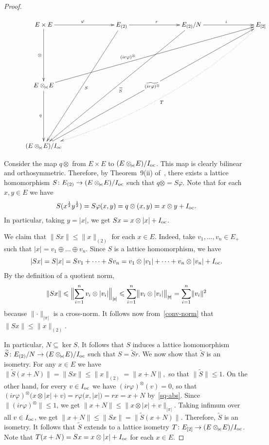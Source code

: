 \documentclass[12pt]{amsart}
\theoremstyle{plain}
\theoremstyle{definition}
\newcommand{\abs}[1]{\lvert#1\rvert}
\newcommand{\norm}[1]{\lVert#1\rVert}
\newcommand{\bignorm}[1]{\bigl\lVert#1\bigr\rVert}
\newcommand{\Bignorm}[1]{\Bigl\lVert#1\Bigr\rVert}
\renewcommand{\le}{\leqslant}
\def\api{{\abs{\!\pi\!}}}
\def\ftp{\otimes_{\!\scriptscriptstyle\api}\!}
\def\xyroot{x^{\frac{1}{2}}{y^{\frac{1}{2}}}}
\def\Ioc{I_{\rm oc}}
\begin{document}
\begin{proof}
  \begin{figure}[!htb]\caption{}\label{diagram-gen}
    \[\xymatrix@=80pt{
    E\times E \ar[r]^\varphi \ar[d]_{\otimes}  & E_{(2)} 
         \ar[ddl]^{S} \ar[r]^r  & 
         E_{(2)}/N \ar[ddll]^{\widetilde{S}} \ar[r]^i &
         E_{[2]} \ar@{.>}@/^2pc/[ddlll]^T  \\
    E\ftp E \ar[urrr]^(0.4){(ir\varphi)^{\otimes}} \ar[d]_q &&&\\
    (E\ftp E)/\Ioc \ar[uurrr]|*+<4pt>{\scriptstyle{\widetilde{(ir\varphi)^\otimes}}} &&
    }
    \]
  \end{figure}

  Consider the map $q\otimes$ from $E\times E$ to
  $(E\ftp E)/\Ioc$. This map is clearly bilinear and
  orthosymmetric. Therefore, by Theorem~9(ii)
  of~\cite{Buskes:01}, there exists a lattice homomorphism $S\colon
  E_{(2)}\to (E\ftp E)/\Ioc$ such that $q\otimes=S\varphi$.
  Note that for each $x,y\in E$ we have
  \begin{equation}
     \label{Sxy-gen}
     S(\xyroot)=S\varphi(x,y)=q\otimes(x,y)=
     x\otimes y+\Ioc.
  \end{equation}
  In particular, taking $y=\abs{x}$, we get
  $Sx=x\otimes\abs{x}+\Ioc$.

  We claim that $\norm{Sx}\le\norm{x}_{(2)}$ for each $x\in E$. Indeed,
  take $v_1,\dots,v_n\in E_+$ such that
  $\abs{x}=v_1\oplus\dots\oplus v_n$. Since $S$ is a lattice homomorphism,
  we have
  \[
    \abs{Sx}=S\abs{x}=Sv_1+\dots+Sv_n
    =v_1\otimes\abs{v_1}+\dots+v_n\otimes\abs{v_n}+\Ioc.
  \]
  By the definition of a quotient norm,
  \[
    \norm{Sx}\le\Bignorm{\sum_{i=1}^nv_i\otimes\abs{v_i}}_\api\le
    \sum_{i=1}^n\bignorm{v_i\otimes\abs{v_i}}_\api=
    \sum_{i=1}^n\norm{v_i}^2
  \]
  because $\norm{\cdot}_\api$ is a cross-norm.  It follows now
  from~\eqref{conv-norm} that $\norm{Sx}\le\norm{x}_{(2)}$.

  In particular, $N\subseteq\ker S$. It follows that $S$ induces a
  lattice homomorphism $\widetilde{S}\colon E_{(2)}/N\to(E\ftp
  E)/\Ioc$ such that $S=\widetilde{S}r$. We now show that $\widetilde
  S$ is an isometry.  For any $x\in E$ we have
  \begin{math}
    \norm{\widetilde{S}(x+N)}
    =\norm{Sx}\le\norm{x}_{(2)}
    =\norm{x+N},
  \end{math}
  so that $\norm{\widetilde S}\le 1$. On the other hand,
  for every $v\in \Ioc$ we have
  $(ir\varphi)^\otimes(v)=0$, so that $(ir\varphi)^\otimes\bigl(x\otimes
  \abs{x}+v\bigr)=r\varphi\bigl(x,\abs{x}\bigr)=rx=x+N$ by~\eqref{sq-abs}. Since
  $\norm{(ir\varphi)^\otimes}\le 1$, we get
  $\norm{x+N}\le\bignorm{x\otimes\abs{x}+v}_\api$. Taking infimum over
  all $v\in \Ioc$, we get $\norm{x+N}\le\norm{Sx}=\norm{\widetilde
    S(x+N)}$. Therefore, $\widetilde S$ is an isometry. It follows that
  $\widetilde S$ extends to a lattice isometry
  $T\colon E_{[2]}\to(E\ftp E)/\Ioc$. Note that
  $T(x+N)=Sx=x\otimes\abs{x}+\Ioc$ for each $x\in E$.


\end{proof}
\end{document}
